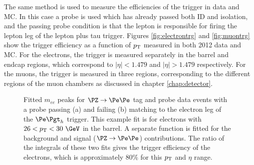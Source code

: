 The same method is used to measure the efficiencies of the trigger
in data and MC. In this case a probe is used which has already passed both ID
and isolation, and the passing probe condition is that the lepton is responsible
for firing the lepton leg of the lepton plus tau trigger. Figures
\ref{fig:electrontrg} and \ref{fig:muontrg} show the trigger efficiency as a
function of $p_{\mathrm{T}}$ measured in both 2012 data and \ac{MC}. For the
electrons, the trigger is measured separately in the barrel and endcap
regions, which correspond to $|\eta| < 1.479$ and $|\eta| > 1.479$
respectively. For the muons, the trigger is measured in three regions, corresponding
to the different regions of the muon chambers as discussed in chapter
\ref{chap:detector}.

\begin{figure}[htb]
\caption[Fitted $m_{ee}$ peaks for $\PZ\to\Pe\Pe$ tag and probe data events with
a probe passing or failing matching to the electron leg of the $\etau$ trigger.]
{Fitted $m_{ee}$ peaks for $\PZ\to\Pe\Pe$ tag and probe data events with a probe passing (a) and
failing (b) matching to the electron leg of the $\etau$ trigger. This example
fit is for electrons with $26 <\pt< 30~\GeV$ in the barrel. A separate function is fitted for the
background and signal ($\PZ\to\Pe\Pe$) contributions. The ratio of the integrals
of these two fits gives the trigger efficiency of the electrons, which is
approximately $80\%$ for this $p_{\mathrm{T}}$ and $\eta$ range.}
\label{fig:tandp}
\end{figure}


